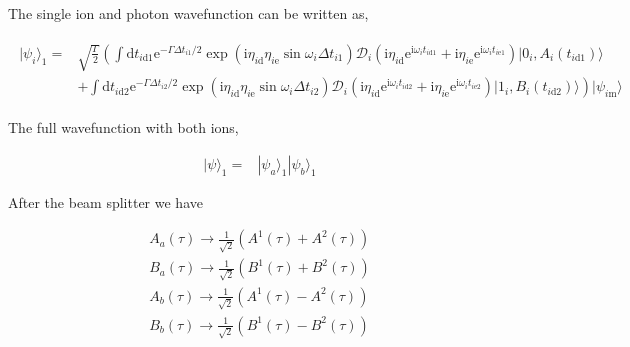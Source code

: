 \documentclass[10pt,fleqn]{article}
\newcommand{\ud}{\mathrm{d}}
\newcommand{\ue}{\mathrm{e}}
\newcommand{\ui}{\mathrm{i}}
\newcommand{\eqar}[1]
{
  \begin{align}
    #1
  \end{align}
}
\newcommand{\paren}[1]{{\left({#1}\right)}}
\newcommand{\lparen}[1]{{\left({#1}\right.}}
\newcommand{\rparen}[1]{{\left.{#1}\right)}}
\begin{document}
The single ion and photon wavefunction can be written as,
\eqar{
  \begin{split}
    |\psi_i\rangle_1=&\sqrt{\frac{\Gamma}{2}}\lparen{\int\ud t_{i\mathrm{d}1}\ue^{-\Gamma\Delta t_{i1}/2}
                       \exp\paren{\ui\eta_{i\mathrm{d}}\eta_{i\mathrm{e}}
                       \sin\omega_i\Delta t_{i1}}
                       \mathcal{D}_i(\ui\eta_{i\mathrm{d}}\ue^{\ui\omega_it_{i\mathrm{d}1}}+\ui\eta_{i\mathrm{e}}\ue^{\ui\omega_it_{i\mathrm{e}1}})|0_i,A_i(t_{i\mathrm{d}1})\rangle}\\
                     &\rparen{+\int\ud t_{i\mathrm{d}2}\ue^{-\Gamma\Delta t_{i2}/2}
                       \exp\paren{\ui\eta_{i\mathrm{d}}\eta_{i\mathrm{e}}
                       \sin\omega_i\Delta t_{i2}}
                       \mathcal{D}_i(\ui\eta_{i\mathrm{d}}\ue^{\ui\omega_it_{i\mathrm{d}2}}+\ui\eta_{i\mathrm{e}}\ue^{\ui\omega_it_{i\mathrm{e}2}})|1_i,B_i(t_{i\mathrm{d}2})\rangle}|\psi_{i\mathrm{m}}\rangle
  \end{split}
}
The full wavefunction with both ions,
\eqar{
  |\psi\rangle_1=&|\psi_a\rangle_1|\psi_b\rangle_1
}

After the beam splitter we have
\eqar{
  A_a(\tau)\rightarrow\frac{1}{\sqrt2}\paren{A^1(\tau)+A^2(\tau)}\\
  B_a(\tau)\rightarrow\frac{1}{\sqrt2}\paren{B^1(\tau)+B^2(\tau)}\\
  A_b(\tau)\rightarrow\frac{1}{\sqrt2}\paren{A^1(\tau)-A^2(\tau)}\\
  B_b(\tau)\rightarrow\frac{1}{\sqrt2}\paren{B^1(\tau)-B^2(\tau)}
}
\end{document}

